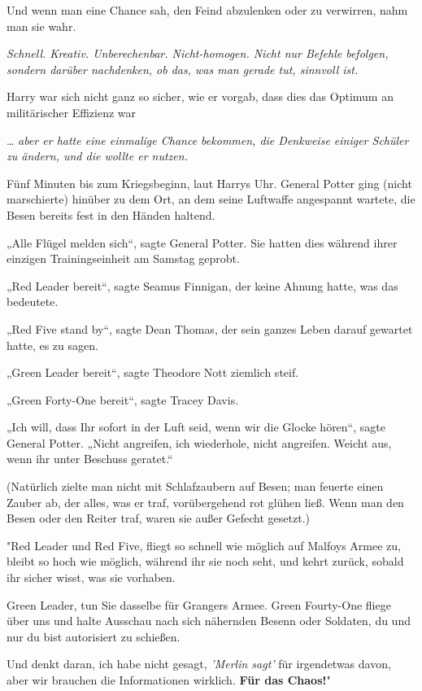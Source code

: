 {Und wenn man eine Chance sah, den Feind abzulenken oder zu verwirren, nahm man sie wahr.

\emph{Schnell. Kreativ. Unberechenbar. Nicht-homogen. Nicht nur Befehle befolgen, sondern darüber nachdenken, ob das, was man gerade tut, sinnvoll ist.}

Harry war sich nicht ganz so sicher, wie er vorgab, dass dies das Optimum an militärischer Effizienz war

… \emph{aber er hatte eine einmalige Chance bekommen, die Denkweise einiger Schüler zu ändern, und die wollte er nutzen.}

Fünf Minuten bis zum Kriegsbeginn, laut Harrys Uhr. General Potter ging (nicht marschierte) hinüber zu dem Ort, an dem seine Luftwaffe angespannt wartete, die Besen bereits fest in den Händen haltend.

„Alle Flügel melden sich“, sagte General Potter. Sie hatten dies während ihrer einzigen Trainingseinheit am Samstag geprobt.

„Red Leader bereit“, sagte Seamus Finnigan, der keine Ahnung hatte, was das bedeutete.

„Red Five stand by“, sagte Dean Thomas, der sein ganzes Leben darauf gewartet hatte, es zu sagen.

„Green Leader bereit“, sagte Theodore Nott ziemlich steif.

„Green Forty-One bereit“, sagte Tracey Davis.

„Ich will, dass Ihr sofort in der Luft seid, wenn wir die Glocke hören“, sagte General Potter. „Nicht angreifen, ich wiederhole, nicht angreifen. Weicht aus, wenn ihr unter Beschuss geratet.“

(Natürlich zielte man nicht mit Schlafzaubern auf Besen; man feuerte einen Zauber ab, der alles, was er traf, vorübergehend rot glühen ließ. Wenn man den Besen oder den Reiter traf, waren sie außer Gefecht gesetzt.)

"Red Leader und Red Five, fliegt so schnell wie möglich auf Malfoys Armee zu, bleibt so hoch wie möglich, während ihr sie noch seht, und kehrt zurück, sobald ihr sicher wisst, was sie vorhaben.

Green Leader, tun Sie dasselbe für Grangers Armee. Green Fourty-One fliege über uns und halte Ausschau nach sich nähernden Besenn oder Soldaten, du und nur du bist autorisiert zu schießen.

Und denkt daran, ich habe nicht gesagt, \emph{'Merlin sagt'} für irgendetwas davon, aber wir brauchen die Informationen wirklich. \textbf{Für das Chaos!}"

}
